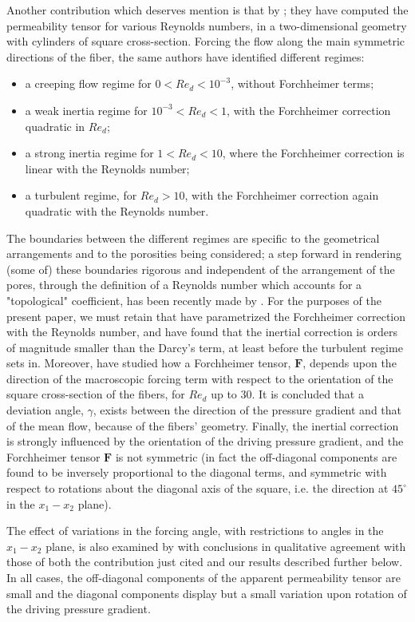 Another contribution which deserves mention is that by \citet{lasseux}; they have computed the permeability tensor 
for various Reynolds numbers, in a two-dimensional geometry with cylinders of square cross-section.
Forcing the flow along the main symmetric directions of the fiber, the same authors have identified different regimes:
\begin{itemize}
	\item a creeping flow regime for $ 0 < Re_d < 10^{-3}$, without Forchheimer terms;
	\item a weak inertia regime for $10^{-3} < Re_d < 1$, with the Forchheimer correction quadratic in $Re_d$; 
	\item a strong inertia regime for $1 < Re_d < 10$, where the Forchheimer correction is linear with the Reynolds number; 
	\item a turbulent regime, for  $Re_d > 10 $, with the Forchheimer correction again quadratic with the Reynolds number.
\end{itemize}  
The boundaries between the different regimes are specific to the geometrical arrangements and to the porosities being considered; 
a step forward in rendering (some of) these boundaries rigorous and independent of the arrangement of the pores, through the definition 
of a Reynolds number which accounts for a "topological" coefficient, has been recently made by \citet{pauthenet}. 
For the purposes of the present paper, we must retain that \citet{lasseux} have parametrized the Forchheimer correction with the Reynolds 
number, and have found that the inertial correction is orders of magnitude smaller than the Darcy's term, at least before the turbulent 
regime sets in. Moreover, \citet{lasseux} have studied how a Forchheimer tensor, $\mathbf{F}$, depends upon the direction of the
macroscopic forcing term with respect to the orientation of the square cross-section of the fibers, for  $Re_d$ up to 30.
It is concluded that a deviation angle, $\gamma$, exists between the direction of the pressure gradient and that of the mean flow,
because of the fibers' geometry. Finally, the inertial correction is strongly influenced by the orientation
of the driving pressure gradient, and the Forchheimer tensor $\mathbf{F}$ is not symmetric (in fact the off-diagonal components 
are found to be inversely proportional to the diagonal terms, and symmetric with respect to rotations about the diagonal axis of 
the square, i.e. the direction at $45^\circ$ in the $x_1 - x_2$ plane).

The effect of variations in the forcing angle, with restrictions to angles in the $x_1 - x_2$ plane, is also examined by 
\citet{soulaine2014} with conclusions in qualitative agreement with those of  both the contribution just cited and our results  
described further below. In all cases, the off-diagonal components of the apparent permeability tensor are small and the diagonal 
components display but a small variation upon rotation of the driving pressure gradient.


